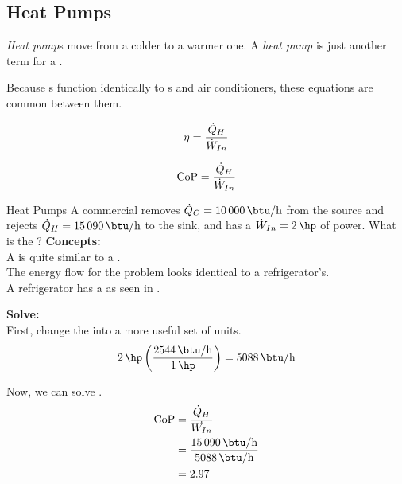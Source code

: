 \subsection{Heat Pumps}\label{subsec:Heat_Pumps}
\begin{definition}\label{def:Heat_Pump}
  \emph{Heat pump}s move  from a colder  to a warmer one.
  A \emph{heat pump} is just another term for a .
\end{definition}

Because s function identically to s and air conditioners, these equations are common between them.

\begin{equation}\label{eq:Heat_Pump-Efficiency}
  \eta = \frac{\dot{Q}_{H}}{\dot{W}_{In}}
\end{equation}

\begin{equation}\label{eq:Heat_Pump-CoP}
  \text{CoP} = \frac{\dot{Q}_{H}}{\dot{W}_{In}}
\end{equation}

\begin{example}{Heat Pumps}
  A commercial  removes $\FlowRate{\Heat}_{C} = \SI{10000}{\btu\per\hour}$ from the source and rejects $\FlowRate{\Heat}_{H} = \SI{15090}{\btu\per\hour}$ to the sink, and has a $\FlowRate{\Work}_{In} = \SI{2}{\hp}$ of power.
  What is the ?
  \tcblower{}
  \textbf{Concepts:} \\
  A  is quite similar to a . \\
  The energy flow for the problem looks identical to a refrigerator's. \\
  A refrigerator has a  as seen in .

  \textbf{Solve:} \\
  First, change the  into a more useful set of units.
  \begin{equation*}
    \SI{2}{\hp} \left( \frac{\SI{2544}{\btu\per\hour}}{\SI{1}{\hp}} \right) = \SI{5088}{\btu\per\hour}
  \end{equation*}

  Now, we can solve .
  \begin{align*}
    \CoP &= \frac{\FlowRate{\Heat}_{H}}{\FlowRate{\Work_{In}}} \\
         &= \frac{\SI{15090}{\btu\per\hour}}{\SI{5088}{\btu\per\hour}} \\
         &= 2.97
  \end{align*}
\end{example}


